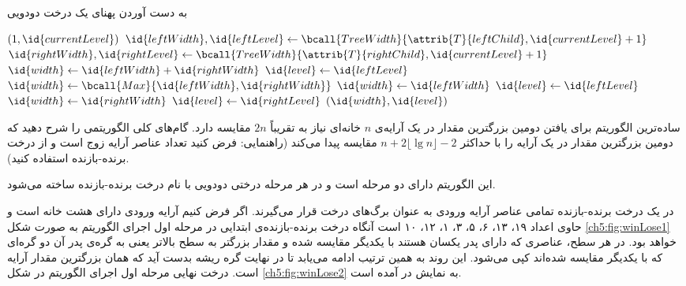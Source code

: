 \begin{algorithm}
\caption{به دست آوردن پهنای یک درخت دودویی}\label{ch5:alg:treeWidth}
\begin{latin}
\begin{algorithmic}[1]
			\State	\Return $(1,\id{currentLevel})$
		\EndIf
		\State	$\id{leftWidth},\id{leftLevel} \gets \bcall{TreeWidth}{\attrib{T}{leftChild},\id{currentLevel}+1}$
		\State	$\id{rightWidth},\id{rightLevel} \gets \bcall{TreeWidth}{\attrib{T}{rightChild},\id{currentLevel}+1}$
			\State	$\id{width} \gets \id{leftWidth}+\id{rightWidth}$
			\State	$\id{level} \gets \id{leftLevel}$
		\Else
			\State	$\id{width} \gets \bcall{Max}{\id{leftWidth},\id{rightWidth}}$
				\State	$\id{width} \gets \id{leftWidth}$
				\State	$\id{level} \gets \id{leftLevel}$
			\Else			
				\State	$\id{width} \gets \id{rightWidth}$			
				\State	$\id{level} \gets \id{rightLevel}$
			\EndIf
		\EndIf
		\State	\Return	$(\id{width},\id{level})$
\EndFunction
\end{algorithmic}
\end{latin}
\end{algorithm}


 ساده‌ترین الگوریتم برای یافتن دومین بزرگترین مقدار در یک آرایه‌ی {$n$} خانه‌ای نیاز به تقریباً {$2n$} مقایسه دارد. گام‌های کلی الگوریتمی را شرح دهید که دومین بزرگترین مقدار در یک آرایه را با حداکثر {$n+2\lfloor \lg n \rfloor - 2$} مقایسه پیدا می‌کند (راهنمایی: فرض کنید تعداد عناصر آرایه زوج است و از درخت‌ برنده-بازنده استفاده کنید).


این الگوریتم دارای دو مرحله است و در هر مرحله درختی دودویی با نام درخت برنده-بازنده ساخته می‌شود.

در یک درخت برنده-بازنده تمامی عناصر آرایه ورودی به عنوان برگ‌های درخت قرار می‌گیرند. اگر فرض کنیم آرایه ورودی دارای هشت خانه است و حاوی اعداد ۱۹، ۱۳، ۶، ۵، ۳، ۱، ۱۲، ۱۰ است آنگاه درخت برنده-بازنده‌ی ابتدایی در مرحله اول اجرای الگوریتم به صورت شکل {\eqref{ch5:fig:winLose1}} خواهد بود. در هر سطح، عناصری که دارای پدر یکسان هستند با یکدیگر مقایسه شده و مقدار بزرگتر به سطح بالاتر یعنی به گره‌ی پدر آن دو گره‌ای که با یکدیگر مقایسه شده‌اند کپی می‌شود. این روند به همین ترتیب ادامه می‌یابد تا در نهایت گره ریشه بدست آید که همان بزرگترین مقدار آرایه است. درخت نهایی مرحله اول اجرای الگوریتم در شکل {\eqref{ch5:fig:winLose2}} به نمایش در آمده است. 

